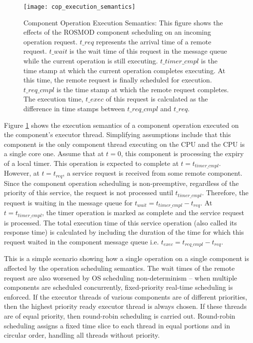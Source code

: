 \begin{figure}[ht]
	\centering
	\texttt{[image: cop\_execution\_semantics]}
	\caption{Component Operation Execution Semantics: This figure shows the effects of the ROSMOD component scheduling on an incoming operation request. $t\_{req}$ represents the arrival time of a remote request. $t\_{wait}$ is the wait time of this request in the message queue while the current operation is still executing. $t\_{timer\_cmpl}$ is the time stamp at which the current operation completes executing. At this time, the remote request is finally scheduled for execution. $t\_{req\_cmpl}$ is the time stamp at which the remote request completes. The execution time, $t\_{exec}$ of this request is calculated as the difference in time stamps between $t\_{req\_cmpl}$ and $t\_{req}$.}
	\label{fig:cop_execution_semantics}
\end{figure}

Figure \ref{fig:cop_execution_semantics} shows the execution semantics of a component operation executed on the component's executor thread. Simplifying assumptions include that this component is the only component thread executing on the CPU and the CPU is a single core one. Assume that at $t=0$, this component is processing the expiry of a local timer. This operation is expected to complete at $t = t_{timer\_cmpl}$. However, at $t = t_{req}$, a service request is received from some remote component. Since the component operation scheduling is non-preemptive, regardless of the priority of this service, the request is not processed until $t_{timer\_cmpl}$. Therefore, the request is waiting in the message queue for $t_{wait} = t_{timer\_cmpl} - t_{req}$. At $t = t_{timer\_cmpl}$, the timer operation is marked as complete and the service request is processed. The total execution time of this service operation (also called its response time) is calculated by including the duration of the time for which this request waited in the component message queue i.e. $t_{exec} = t_{req\_cmpl} - t_{req}$. 

This is a simple scenario showing how a single operation on a single component is affected by the operation scheduling semantics. The wait times of the remote request are also worsened by OS scheduling non-determinism -- when multiple components are scheduled concurrently, fixed-priority real-time scheduling is enforced. If the executor threads of various components are of different priorities, then the highest priority ready executor thread is always chosen. If these threads are of equal priority, then round-robin scheduling is carried out. Round-robin scheduling assigns a fixed time slice to each thread in equal portions and in circular order, handling all threads without priority. %

